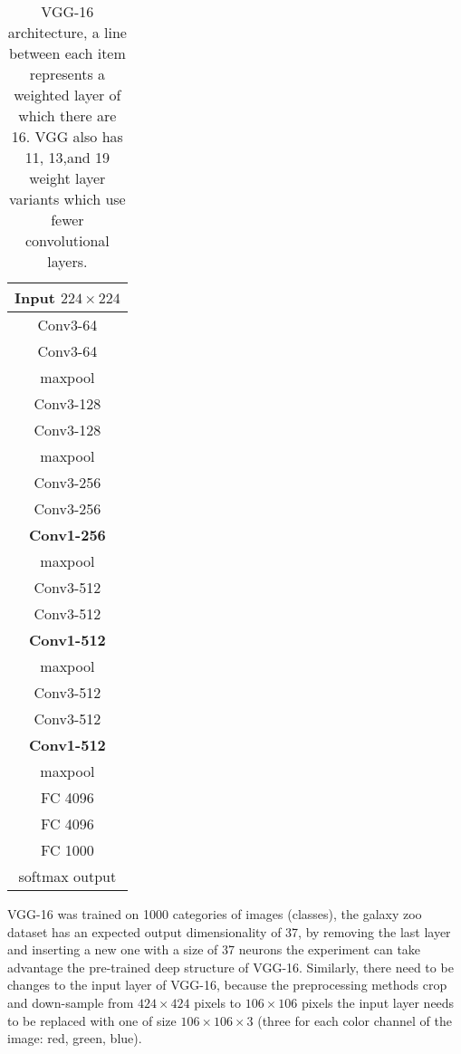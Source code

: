 \begin{table}
    \begin{center}
        \begin{tabular}{| c |}
        \hline
        Input $224 \times 224$ \\
        \hline
        Conv3-64 \\
        Conv3-64 \\
        \hline
        maxpool\\
        \hline
        Conv3-128\\
        Conv3-128\\
        \hline
        maxpool\\
        \hline
        Conv3-256\\
        Conv3-256\\
        \textbf{Conv1-256}\\
        \hline
        maxpool\\
        \hline
        Conv3-512\\
        Conv3-512\\
        \textbf{Conv1-512}\\
        \hline
        maxpool \\
        \hline
        Conv3-512\\
        Conv3-512\\
        \textbf{Conv1-512}\\
        \hline
        maxpool\\
        \hline
        FC 4096\\
        \hline
        FC 4096\\
        \hline
        FC 1000\\
        \hline
        softmax output\\
        \hline
        \end{tabular}
        \caption{VGG-16 architecture, a line between each item represents a weighted layer of which there are 16. VGG also has 11, 13,and 19 weight layer variants which use fewer convolutional layers.}
    \end{center}
\end{table}


VGG-16 was trained on 1000 categories of images (classes), the galaxy zoo dataset has an expected output dimensionality of 37, by removing the last layer and inserting a new one with a size of 37 neurons the experiment can take advantage the pre-trained deep structure of VGG-16. Similarly, there need to be changes to the input layer of VGG-16, because the preprocessing methods crop and down-sample from $424 \times 424$ pixels to $106 \times 106$ pixels the input layer needs to be replaced with one of size $106 \times 106 \times 3$ (three for each color channel of the image: red, green, blue).
